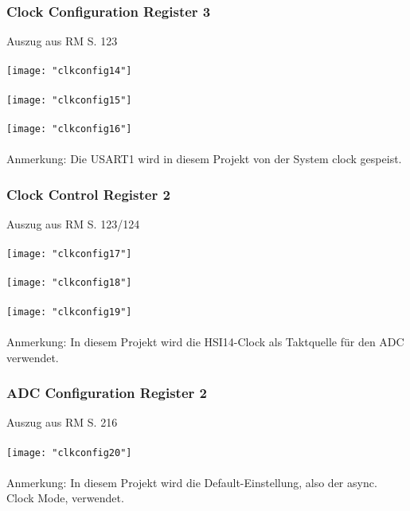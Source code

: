 \documentclass[11pt]{report}
\begin{document}
			\subsubsection{Clock Configuration Register 3}
				Auszug aus RM S. 123\\
				\\\texttt{[image: "clkconfig14"]}\\
				\\\texttt{[image: "clkconfig15"]}\\
				\\\texttt{[image: "clkconfig16"]}\\
				\\Anmerkung: Die USART1 wird in diesem Projekt von der System clock gespeist.
			\subsubsection{Clock Control Register 2}
				Auszug aus RM S. 123/124\\
				\\\texttt{[image: "clkconfig17"]}\\
				\\\texttt{[image: "clkconfig18"]}\\
				\\\texttt{[image: "clkconfig19"]}\\
				\\Anmerkung: In diesem Projekt wird die HSI14-Clock als Taktquelle für den ADC verwendet.
			\subsubsection{ADC Configuration Register 2}
				Auszug aus RM S. 216\\
				\\\texttt{[image: "clkconfig20"]}\\
				\\Anmerkung: In diesem Projekt wird die Default-Einstellung, also der async. Clock Mode, verwendet.
\end{document}
